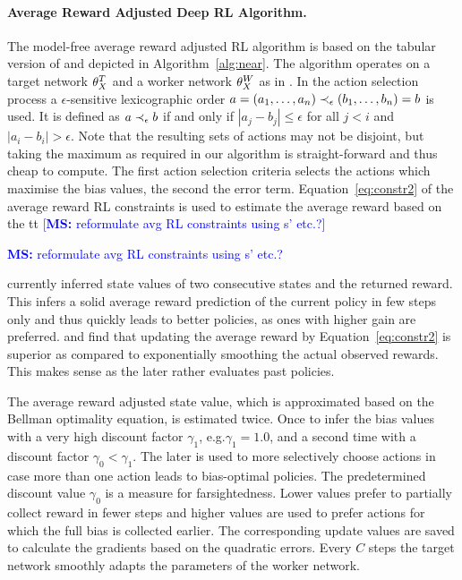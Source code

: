 \documentclass[envcountsame]{llncs}
\newcommand\MS[2][r]{\ifx t#1 \textcolor{blue}{[\textbf{MS:} #2]}
  \else \begin{center}\textcolor{blue}{\textbf{MS:} #2} \end{center} \fi}
\begin{document}
\paragraph{Average Reward Adjusted Deep RL Algorithm.} %
The model-free average reward adjusted RL algorithm is based on the tabular version of
\citet{schneckenreither2020average} and depicted in Algorithm~\ref{alg:near}. The algorithm operates
on a target network \(\theta_X^{T}{}\) and a worker network \(\theta_X^{W}{}\) as in
\citet{mnih2015human}. %
%
In the action selection process a \(\epsilon\)-sensitive lexicographic order
\(a=(a_{1},\ldots,a_{n}) \prec_{\epsilon} (b_{1},\ldots,b_{n})=b\) is used. It is defined as \(a \prec_{\epsilon} b\) if and
only if \(| a_{j} - b_{j} | \leqslant \epsilon\) for all \(j < i\) and
\(|a_{i} - b_{i}| > \epsilon\). Note that the resulting sets of actions may not be disjoint, but
taking the maximum as required in our algorithm is straight-forward and thus cheap to compute. The
first action selection criteria selects the actions which maximise the bias values, the second the
error term.
%
Equation~\ref{eq:constr2} of the average reward RL constraints is used to estimate the average
reward based on the \MS[t]{reformulate avg RL constraints using s' etc.?} currently inferred state
values of two consecutive states and the returned reward. %
This infers a solid average reward prediction of the current policy in few steps only and thus
quickly leads to better policies, as ones with higher gain are preferred.
\citet{schneckenreither2020average} and
\citet{Tadepalli98_ModelbasedAverageRewardReinforcementLearning} find that updating the average
reward by Equation~\ref{eq:constr2} is superior as compared to exponentially smoothing the actual
observed rewards. This makes sense as the later rather evaluates past policies.

The average reward adjusted state value, which is approximated based on the Bellman optimality
equation, is estimated twice. Once to infer the bias values with a very high discount factor
\(\gamma_{1}\), e.g.\@ \(\gamma_{1} = 1.0\), and a second time with a discount factor
\(\gamma_{0} < \gamma_{1}\). The later is used to more selectively choose actions in case more than
one action leads to bias-optimal policies. The predetermined discount value \(\gamma_{0}\) is a
measure for farsightedness. Lower values prefer to partially collect reward in fewer steps and
higher values are used to prefer actions for which the full bias is collected earlier.
%
The corresponding update values are saved to calculate the gradients based on the quadratic errors.
Every \(C\) steps the target network smoothly adapts the parameters of the worker network.
\end{document}
